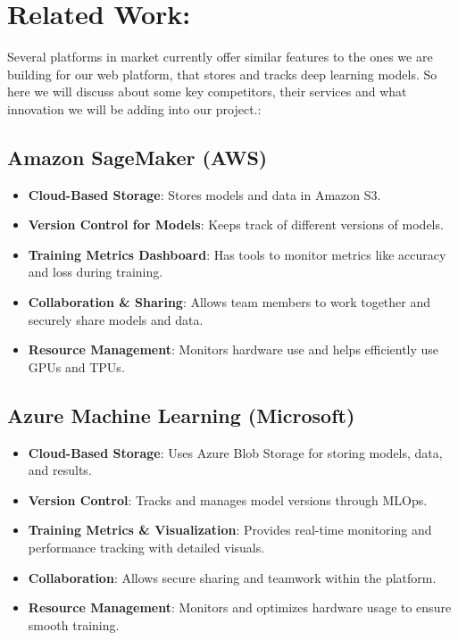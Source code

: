 \documentclass[12pt]{article}
\begin{document}
\section{Related Work:}


\maketitle

Several platforms in market currently offer similar features to the ones we are building for our web platform, that stores and tracks deep learning models. So here we will discuss about some key competitors, their services and what innovation we will be adding into our project.:

\subsection{Amazon SageMaker (AWS)}
\begin{itemize}
    \item \textbf{Cloud-Based Storage}: Stores models and data in Amazon S3.
    \item \textbf{Version Control for Models}: Keeps track of different versions of models.
    \item \textbf{Training Metrics Dashboard}: Has tools to monitor metrics like accuracy and loss during training.
    \item \textbf{Collaboration \& Sharing}: Allows team members to work together and securely share models and data.
    \item \textbf{Resource Management}: Monitors hardware use and helps efficiently use GPUs and TPUs.
\cite{aws_sagemaker}

\end{itemize}

\subsection*{Azure Machine Learning (Microsoft)}
\begin{itemize}
    \item \textbf{Cloud-Based Storage}: Uses Azure Blob Storage for storing models, data, and results.
    \item \textbf{Version Control}: Tracks and manages model versions through MLOps.
    \item \textbf{Training Metrics \& Visualization}: Provides real-time monitoring and performance tracking with detailed visuals.
    \item \textbf{Collaboration}: Allows secure sharing and teamwork within the platform.
    \item \textbf{Resource Management}: Monitors and optimizes hardware usage to ensure smooth training.
\cite{azume_ml}

\end{itemize}
\end{document}
